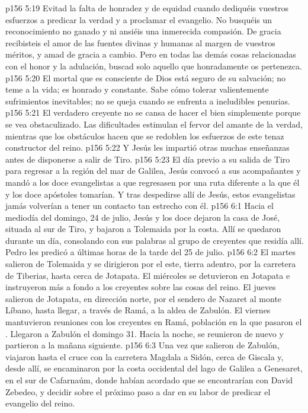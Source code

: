 \vs p156 5:19 Evitad la falta de honradez y de equidad cuando dediquéis vuestros esfuerzos a predicar la verdad y a proclamar el evangelio. No busquéis un reconocimiento no ganado y ni ansiéis una inmerecida compasión. De gracia recibisteis el amor de las fuentes divinas y humanas al margen de vuestros méritos, y amad de gracia a cambio. Pero en todas las demás cosas relacionadas con el honor y la adulación, buscad solo aquello que honradamente os pertenezca.
\vs p156 5:20 El mortal que es consciente de Dios está seguro de su salvación; no teme a la vida; es honrado y constante. Sabe cómo tolerar valientemente sufrimientos inevitables; no se queja cuando se enfrenta a ineludibles penurias.
\vs p156 5:21 El verdadero creyente no se cansa de hacer el bien simplemente porque se vea obstaculizado. Las dificultades estimulan el fervor del amante de la verdad, mientras que los obstáculos hacen que se redoblen los esfuerzos de este tenaz constructor del reino.
\vs p156 5:22 \pc Y Jesús les impartió otras muchas enseñanzas antes de disponerse a salir de Tiro.
\vs p156 5:23 El día previo a su salida de Tiro para regresar a la región del mar de Galilea, Jesús convocó a sus acompañantes y mandó a los doce evangelistas a que regresasen por una ruta diferente a la que él y los doce apóstoles tomarían. Y tras despedirse allí de Jesús, estos evangelistas jamás volverían a tener un contacto tan estrecho con él.
\vs p156 6:1 Hacia el mediodía del domingo, 24 de julio, Jesús y los doce dejaron la casa de José, situada al sur de Tiro, y bajaron a Tolemaida por la costa. Allí se quedaron durante un día, consolando con sus palabras al grupo de creyentes que residía allí. Pedro les predicó a últimas horas de la tarde del 25 de julio.
\vs p156 6:2 El martes salieron de Tolemaida y se dirigieron por el este, tierra adentro, por la carretera de Tiberias, hasta cerca de Jotapata. El miércoles se detuvieron en Jotapata e instruyeron más a fondo a los creyentes sobre las cosas del reino. El jueves salieron de Jotapata, en dirección norte, por el sendero de Nazaret al monte Líbano, hasta llegar, a través de Ramá, a la aldea de Zabulón. El viernes mantuvieron reuniones con los creyentes en Ramá, población en la que pasaron el . Llegaron a Zabulón el domingo 31. Hacia la noche, se reunieron de nuevo y partieron a la mañana siguiente.
\vs p156 6:3 Una vez que salieron de Zabulón, viajaron hasta el cruce con la carretera Magdala a Sidón, cerca de Giscala y, desde allí, se encaminaron por la costa occidental del lago de Galilea a Genesaret, en el sur de Cafarnaúm, donde habían acordado que se encontrarían con David Zebedeo, y decidir sobre el próximo paso a dar en su labor de predicar el evangelio del reino.
